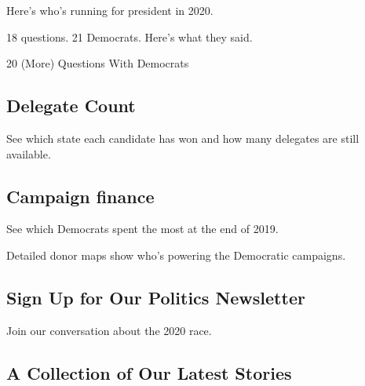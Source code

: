 Here's who's running for president in 2020.

\href{https://www.nytimes3xbfgragh.onion/interactive/2019/us/politics/2020-candidate-interviews.html}{}

18 questions. 21 Democrats. Here's what they said.

\href{https://www.nytimes3xbfgragh.onion/interactive/2020/us/politics/democratic-candidates-20-questions.html}{}

20 (More) Questions With Democrats

\href{https://www.nytimes3xbfgragh.onion/interactive/2020/us/elections/delegate-count-primary-results.html}{}

\hypertarget{delegate-count}{%
\subsection{Delegate Count}\label{delegate-count}}

See which state each candidate has won and how many delegates are still
available.

\href{https://www.nytimes3xbfgragh.onion/interactive/2020/02/01/us/elections/democratic-q4-fundraising.html}{}

\hypertarget{campaign-finance}{%
\subsection{Campaign finance}\label{campaign-finance}}

See which Democrats spent the most at the end of 2019.

\href{https://www.nytimes3xbfgragh.onion/interactive/2020/02/01/us/politics/democratic-presidential-campaign-donors.html}{}

Detailed donor maps show who's powering the Democratic campaigns.

\href{https://www.nytimes3xbfgragh.onion/newsletters/politics}{}

\hypertarget{sign-up-for-our-politics-newsletter}{%
\subsection{Sign Up for Our Politics
Newsletter}\label{sign-up-for-our-politics-newsletter}}

Join our conversation about the 2020 race.

\href{https://www.nytimes3xbfgragh.onion/news-event/2020-election}{}

\hypertarget{a-collection-of-our-latest-stories}{%
\subsection{A Collection of Our Latest
Stories}\label{a-collection-of-our-latest-stories}}

